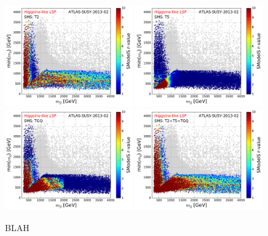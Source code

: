 \documentclass[a4paper,10pt]{article}
\begin{document}
\begin{figure}[!]
\begin{center}
\subfigure
{\includegraphics[width=0.49\textwidth]{PLOTS/Combination/ATLAS-SUSY-2013-02_Higgsino_SMS_T2_Glu_Squ.pdf}}
\subfigure
{\includegraphics[width=0.49\textwidth]{PLOTS/Combination/ATLAS-SUSY-2013-02_Higgsino_SMS_T5_Glu_Squ.pdf}}
\subfigure
{\includegraphics[width=0.49\textwidth]{PLOTS/Combination/ATLAS-SUSY-2013-02_Higgsino_SMS_TGQ_Glu_Squ.pdf}}
\subfigure
{\includegraphics[width=0.49\textwidth]{PLOTS/Combination/ATLAS-SUSY-2013-02_Higgsino_SMS_T2+T5+TGQ_Glu_Squ.pdf}}
\end{center}
\caption{BLAH} 
\end{figure}





\end{document}
